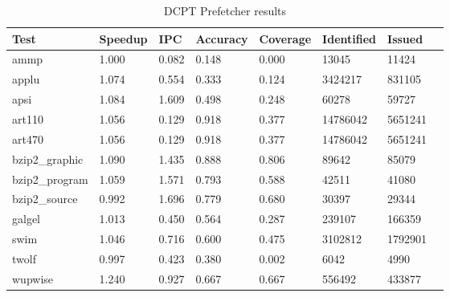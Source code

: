 \begin{table*}[!t]
\renewcommand{\arraystretch}{1.3}
\caption{DCPT Prefetcher results}
\label{table:results3}
\centering
\begin{tabular}{|l|l|l|l|l|l|l|l|}
\hline
\bfseries Test & \bfseries Speedup & \bfseries IPC & \bfseries Accuracy & \bfseries Coverage & \bfseries Identified & \bfseries Issued\\
\hline
\hline
ammp 		& 1.000 & 	0.082 &	0.148 &	0.000 &	13045 &	11424\\
applu 		& 1.074 & 	0.554 &	0.333 &	0.124 &	3424217 & 	831105\\
apsi 		& 1.084 & 	1.609 &	0.498 &	0.248 &	60278 &	59727\\	
art110 		& 1.056 & 	0.129 &	0.918 &	0.377 &	14786042 &	5651241\\	
art470 		& 1.056 & 	0.129 &	0.918 &	0.377 &	14786042 &	5651241\\
bzip2\_graphic 	& 1.090 & 	1.435 &	0.888 &	0.806 &	89642 &	85079 	\\
bzip2\_program 	& 1.059 & 	1.571 &	0.793 &	0.588 &	42511 &	41080 	\\
bzip2\_source 	& 0.992 & 	1.696 &	0.779 &	0.680 &	30397 &	29344\\
galgel 		& 1.013 & 	0.450 &	0.564 &	0.287 &	239107 &	 166359\\
swim 		& 1.046 & 	0.716 &	0.600 &	0.475 &	3102812 & 	1792901\\
twolf 		& 0.997 & 	0.423 &	0.380 &	0.002 &	6042 &	4990 		\\
wupwise 	& 1.240 & 	0.927 &	0.667 &	0.667 &	556492 & 	433877 	\\
\hline
\end{tabular}
\end{table*}




